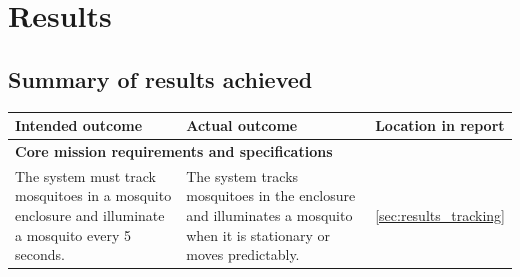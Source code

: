 
\section{Results}

\subsection{Summary of results achieved}
\begin{table}[H]
  \centering
  \begin{tabularx}{\textwidth}{|X|X|l|}
    \hline
    \textbf{Intended outcome}                                                                                                                                                    &
    \textbf{Actual outcome}                                                                                                                                                      &
    \textbf{Location in report}                                                                                                                                                                                                                                                                                                                  \\
    \hline
    \multicolumn{3}{|l|}{\textbf{Core mission requirements and specifications}}                                                                                                                                                                                                                                                                  \\
    \hline
    The system must track mosquitoes in a mosquito enclosure and illuminate a mosquito every 5 seconds.                                                                          &
    The system tracks mosquitoes in the enclosure and illuminates a mosquito when it is stationary or moves predictably.                                                         &
    \autoref{sec:results_tracking}                                                                                                                                                                                                                                                                                                               \\

\end{tabularx}
\end{table}
